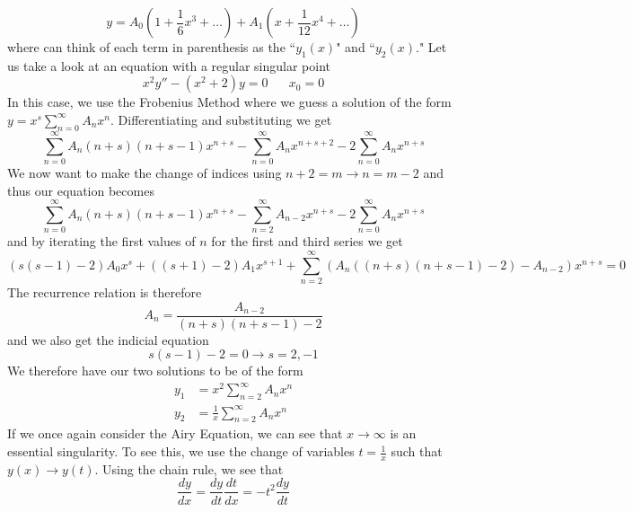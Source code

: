 \documentclass{article}
\newcommand{\od}[2]{\frac{d #1}{d #2}}
\newcommand{\twen}{\hspace{20pt}}
\begin{document}
\begin{equation*}
    y=A_0\left(1+\frac{1}{6}x^3+\ldots \right)+A_1\left(x+\frac{1}{12}x^4+\ldots \right)
\end{equation*}
where can think of each term in parenthesis as the ``$y_1(x)$" and ``$y_2(x)$." Let us take a look at an equation with a regular singular point 
\begin{equation*}
    x^2y'' -(x^2+2)y=0 \twen x_0=0
\end{equation*}
In this case, we use the Frobenius Method where we guess a solution of the form $y=x^s \displaystyle{\sum^\infty_{n=0}A_nx^{n}}$. Differentiating and substituting we get 
\begin{equation*}
    \sum^\infty _{n=0}A_n(n+s)(n+s-1)x^{n+s} - \sum^\infty_{n=0}A_nx^{n+s+2} -2\sum^\infty_{n=0}A_nx^{n+s}
\end{equation*}
We now want to make the change of indices using $n+2 = m \rightarrow n=m-2$ and thus our equation becomes 
\begin{equation*}
    \sum^\infty _{n=0}A_n(n+s)(n+s-1)x^{n+s} - \sum^\infty_{n=2}A_{n-2}x^{n+s} -2\sum^\infty_{n=0}A_nx^{n+s}
\end{equation*}
and by iterating the first values of $n$ for the first and third series we get 
\begin{equation*}
    (s(s-1)-2)A_0x^s +((s+1)-2)A_1x^{s+1}+\sum^\infty_{n=2}(A_n((n+s)(n+s-1)-2)-A_{n-2})x^{n+s} =0
\end{equation*}
The recurrence relation is therefore 
\begin{equation*}
    A_n=\frac{A_{n-2}}{(n+s)(n+s-1)-2}
\end{equation*}
and we also get the indicial equation 
\begin{equation*}
    s(s-1)-2=0\rightarrow s=2,-1
\end{equation*}
We therefore have our two solutions to be of the form 
\begin{equation*}
    \begin{split}
        y_1&=x^2\sum^\infty_{n=2}A_nx^n \\
        y_2&=\frac{1}{x}\sum^\infty_{n=2}A_nx^n
    \end{split}
\end{equation*}
If we once again consider the Airy Equation, we can see that $x\rightarrow \infty$ is an essential singularity. To see this, we use the change of variables $t=\frac{1}{x}$ such that $y(x)\rightarrow y(t)$. Using the chain rule, we see that 
\begin{equation*}
    \od{y}{x}=\od{y}{t}\od{t}{x} =-t^2\od{y}{t}
\end{equation*}
\end{document}
